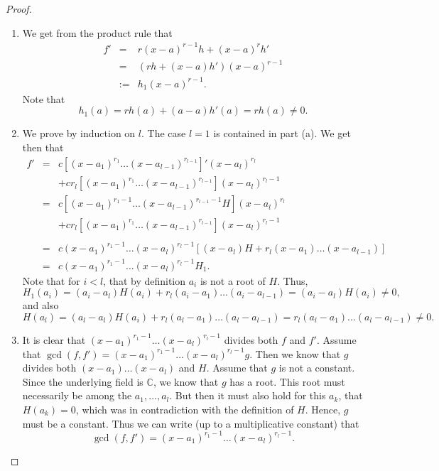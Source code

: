 \begin{proof}
\begin{enumerate}
    \item We get from the product rule that
    \begin{eqnarray*}
        f'
        & = & r(x-a)^{r-1} h + (x-a)^r h'\\
        & = & (rh + (x-a) h') (x-a)^{r-1}\\
        & := & h_1 (x-a)^{r-1}.
    \end{eqnarray*}
    Note that
    $$h_1(a) = rh(a) + (a-a)h'(a) = rh(a)\neq 0.$$
    \item We prove by induction on $l$. The case $l=1$ is contained in part (a). We get then that
    \begin{eqnarray*}
        f'
        & = & c\left[(x-a_1)^{r_1} \dots (x-a_{l-1})^{r_{l-1}}\right]' (x-a_l)^{r_l}\\
        & & + cr_l \left[(x-a_1)^{r_1} \dots (x-a_{l-1})^{r_{l-1}}\right] (x-a_l)^{r_l-1}\\
        & = & c\left[(x-a_1)^{r_1-1}\dots(x-a_{l-1})^{r_{l-1}-1}H\right] (x-a_l)^{r_l}\\
        & & + cr_l \left[(x-a_1)^{r_1} \dots (x-a_{l-1})^{r_{l-1}}\right] (x-a_l)^{r_l-1}\\\\
        & = & c(x-a_1)^{r_1-1}\dots(x-a_l)^{r_l-1} \left[ (x-a_l)H +r_l (x-a_1) \dots (x-a_{l-1})\right]\\
        & = & c(x-a_1)^{r_1-1}\dots(x-a_l)^{r_l-1} H_1.
    \end{eqnarray*}
    Note that for $i<l$, that by definition $a_i$ is not a root of $H$. Thus,
    $$H_1(a_i) = (a_i-a_l)H(a_i) + r_l(a_i-a_1) \dots (a_i-a_{l-1}) = (a_i - a_l)H(a_i)\neq 0,$$
    and also
    $$H(a_l) = (a_l-a_l)H(a_i) + r_l(a_l-a_1) \dots (a_l-a_{l-1})= r_l(a_l-a_1) \dots (a_l-a_{l-1}) \neq 0.$$
    \item It is clear that $(x-a_1)^{r_1 - 1} \dots (x - a_l)^{r_l -1}$ divides both $f$ and $f'$. Assume that $\gcd(f,f') = (x-a_1)^{r_1 - 1} \dots (x - a_l)^{r_l -1} g$. Then we know that $g$ divides both $(x-a_1)\dots(x-a_l)$ and $H$. Assume that $g$ is not a constant. Since the underlying field is $\mathbb{C}$, we know that $g$ has a root. This root must necessarily be among the $a_1,\dots,a_l$. But then it must also hold for this $a_k$, that $H(a_k) = 0$, which was in contradiction with the definition of $H$. Hence, $g$ must be a constant. Thus we can write (up to a multiplicative constant) that
    $$\gcd(f,f') = (x-a_1)^{r_1 - 1} \dots (x - a_l)^{r_l -1}.$$
\end{enumerate}
\end{proof}


